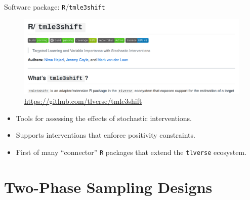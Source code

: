\documentclass{beamer}
\begin{document}
\begin{frame}[c]{Software package: \texttt{R}/\texttt{tmle3shift}}

\begin{figure}[H]
  \centering
  \includegraphics[width=\textwidth]{tmle3shift}
  \caption{
    \url{https://github.com/tlverse/tmle3shift}
  }
\end{figure}

\vspace{-2em}

\begin{center}
\begin{itemize}
  \itemsep4pt
  \item Tools for assessing the effects of stochastic interventions.
  \item Supports interventions that enforce positivity constraints.
  \item First of many ``connector'' \texttt{R} packages that extend the
    \texttt{tlverse} ecosystem.
\end{itemize}
\end{center}


\end{frame}


\section{Two-Phase Sampling Designs}

\end{document}
